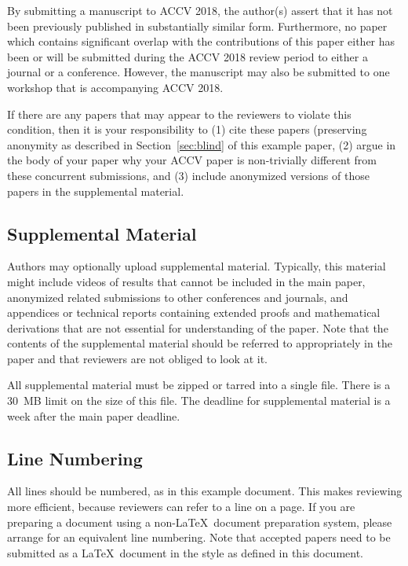 \documentclass[runningheads]{llncs}
\begin{document}
By submitting a manuscript to ACCV 2018, the author(s) assert that it has
not been previously published in substantially similar
form. Furthermore, no paper which contains significant overlap with
the contributions of this paper either has been or will be submitted
during the ACCV 2018 review period to either a journal or a
conference. However, the manuscript may also be submitted to
one workshop that is accompanying ACCV 2018.

If there are any papers that may appear to the reviewers to violate
this condition, then it is your responsibility to (1) cite these
papers (preserving anonymity as described in Section~\ref{sec:blind}
of this example paper, (2) argue in the body of your paper why your
ACCV paper is non-trivially different from these concurrent
submissions, and (3) include anonymized versions of those papers in
the supplemental material.

\subsection{Supplemental Material} 

Authors may optionally upload supplemental material. Typically, this
material might include videos of results that cannot be included in
the main paper, anonymized related submissions to other conferences
and journals, and appendices or technical reports containing extended
proofs and mathematical derivations that are not essential for
understanding of the paper. Note that the contents of the supplemental
material should be referred to appropriately in the paper and that
reviewers are not obliged to look at it.

All supplemental material must be zipped or tarred into a single file. There is a 30~MB limit on the size of this file. The deadline for supplemental material is a week after the main paper deadline.

\subsection{Line Numbering}

All lines should be numbered, as in this example document. This makes
reviewing more efficient, because reviewers can refer to a line on a
page. If you are preparing a document using a non-\LaTeX\
document preparation system, please arrange for an equivalent line numbering. Note that accepted papers need to be submitted as a \LaTeX\
document in the style as defined in this document.
\end{document}
